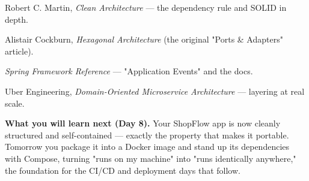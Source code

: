 \begin{wbitem}
  \item Robert C. Martin, \emph{Clean Architecture} --- the dependency rule and SOLID in depth.
  \item Alistair Cockburn, \emph{Hexagonal Architecture} (the original "Ports \& Adapters" article).
  \item \emph{Spring Framework Reference} --- "Application Events" and the  docs.
  \item Uber Engineering, \emph{Domain-Oriented Microservice Architecture} --- layering at real scale.
\end{wbitem}

\begin{keyidea}
\textbf{What you will learn next (Day 8).} Your ShopFlow app is now cleanly structured and self-contained --- exactly the property that makes it portable. Tomorrow you package it into a Docker image and stand up its dependencies with Compose, turning "runs on my machine" into "runs identically anywhere," the foundation for the CI/CD and deployment days that follow.
\end{keyidea}
